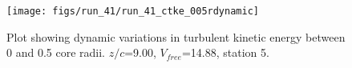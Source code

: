 \begin{figure}[H]
\centering
\texttt{[image: figs/run\_41/run\_41\_ctke\_005rdynamic]}
\caption{Plot showing dynamic variations in turbulent kinetic energy between 0 and 0.5 core radii. $z/c$=9.00, $V_{free}$=14.88, station 5.}
\label{fig:run_41_ctke_005rdynamic}
\end{figure}


